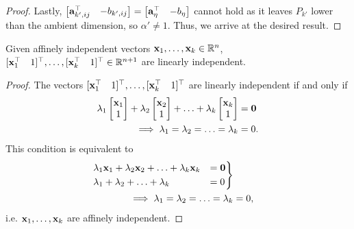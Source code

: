 \begin{proof}
Lastly, $\begin{bmatrix} \multicolumn{2}{c}{\ba_{k',ij}^\top} & -b_{k',ij} \end{bmatrix} = \begin{bmatrix} \ba^\top_\eta & -b_\eta \end{bmatrix}$ cannot hold as it leaves $P_{k'}$ lower than the ambient dimension, so $\alpha' \neq 1$. Thus, we arrive at the desired result.
\end{proof}



\begin{lemma}\label{lemma:affine}
Given affinely independent vectors $\mathbf{x}_1,\ldots,\mathbf{x}_k \in \mathbb{R}^n$, $[\mathbf{x}_1^\top \quad 1 ]^\top, \ldots, [ \mathbf{x}_k^\top \quad 1 ]^\top \in \mathbb{R}^{n+1}$ are linearly independent.
\end{lemma}
\begin{proof}
The vectors $[\mathbf{x}_1^\top \quad 1 ]^\top, \ldots, [ \mathbf{x}_k^\top \quad 1 ]^\top$ are linearly independent if and only if
\begin{subequations}
\begin{align}
    \lambda_1\begin{bmatrix} \mathbf{x}_1 \\ 1 \end{bmatrix} + \lambda_2\begin{bmatrix} \mathbf{x}_2 \\ 1 \end{bmatrix} + \ldots + \lambda_k\begin{bmatrix} \mathbf{x}_{k} \\ 1 \end{bmatrix} &= \mathbf{0} \\
    \implies \lambda_1 = \lambda_2 = \ldots = \lambda_k &= 0.
\end{align}
\end{subequations}
This condition is equivalent to
\begin{subequations}
\begin{align}
    \begin{rcases}
    \lambda_1 \mathbf{x}_1 + \lambda_2 \mathbf{x}_2 + \ldots + \lambda_k \mathbf{x}_k &= \mathbf{0} \\
    \lambda_1 + \lambda_2 + \ldots + \lambda_k &= 0
  \end{rcases} \\
  \implies \lambda_1 = \lambda_2 = \ldots = \lambda_k &= 0,
\end{align}
\end{subequations}
i.e. $\mathbf{x}_1,\ldots,\mathbf{x}_k$ are affinely independent.
\end{proof}


